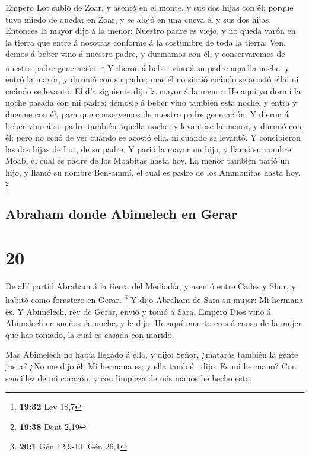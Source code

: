  Empero Lot subió de Zoar, y asentó en el monte, y sus dos
hijas con él; porque tuvo miedo de quedar en Zoar, y se alojó en una
cueva él y sus dos hijas.  Entonces la mayor dijo á la
menor: Nuestro padre es viejo, y no queda varón en la tierra que entre á
nosotras conforme á la costumbre de toda la tierra:  Ven,
demos á beber vino á nuestro padre, y durmamos con él, y conservaremos
de nuestro padre generación. \footnote{\textbf{19:32} Lev 18,7}
 Y dieron á beber vino á su padre aquella noche: y entró la
mayor, y durmió con su padre; mas él no sintió cuándo se acostó ella, ni
cuándo se levantó.  El día siguiente dijo la mayor á la
menor: He aquí yo dormí la noche pasada con mi padre; démosle á beber
vino también esta noche, y entra y duerme con él, para que conservemos
de nuestro padre generación.  Y dieron á beber vino á su
padre también aquella noche: y levantóse la menor, y durmió con él; pero
no echó de ver cuándo se acostó ella, ni cuándo se levantó.
 Y concibieron las dos hijas de Lot, de su padre.
 Y parió la mayor un hijo, y llamó su nombre Moab, el cual
es padre de los Moabitas hasta hoy.  La menor también parió
un hijo, y llamó su nombre Ben-ammí, el cual es padre de los Ammonitas
hasta hoy. \footnote{\textbf{19:38} Deut 2,19}

\hypertarget{abraham-donde-abimelech-en-gerar}{%
\subsection{Abraham donde Abimelech en
Gerar}\label{abraham-donde-abimelech-en-gerar}}

\hypertarget{section-19}{%
\section{20}\label{section-19}}

 De allí partió Abraham á la tierra del Mediodía, y asentó
entre Cades y Shur, y habitó como forastero en Gerar. \footnote{\textbf{20:1}
  Gén 12,9-10; Gén 26,1}  Y dijo Abraham de Sara su mujer:
Mi hermana es. Y Abimelech, rey de Gerar, envió y tomó á Sara.
 Empero Dios vino á Abimelech en sueños de noche, y le dijo:
He aquí muerto eres á causa de la mujer que has tomado, la cual es
casada con marido.

 Mas Abimelech no había llegado á ella, y dijo: Señor,
¿matarás también la gente justa?  ¿No me dijo él: Mi hermana
es; y ella también dijo: Es mi hermano? Con sencillez de mi corazón, y
con limpieza de mis manos he hecho esto.

